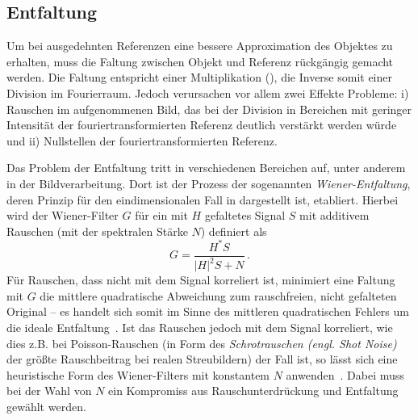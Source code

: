 \subsection{Entfaltung}
Um bei ausgedehnten Referenzen eine bessere Approximation des Objektes zu erhalten, muss die Faltung zwischen Objekt und Referenz rückgängig gemacht werden. Die Faltung entspricht einer Multiplikation (), die Inverse somit einer Division im Fourierraum. Jedoch verursachen vor allem zwei Effekte Probleme: i) Rauschen im aufgenommenen Bild, das bei der Division in Bereichen mit geringer Intensität der fouriertransformierten Referenz deutlich verstärkt werden würde und ii) Nullstellen der fouriertransformierten Referenz. 

Das Problem der Entfaltung tritt in verschiedenen Bereichen auf, unter anderem in der Bildverarbeitung.
Dort ist der Prozess der sogenannten \textit{Wiener-Entfaltung}, deren Prinzip für den eindimensionalen Fall in  dargestellt ist, etabliert. Hierbei wird der Wiener-Filter $G$ für ein mit $H$ gefaltetes Signal $S$ mit additivem Rauschen (mit der spektralen Stärke $N$) definiert als
\begin{equation}
	G=\frac{H^* S}{\left|H\right|^2 S+N}\,.
\end{equation}
Für Rauschen, dass nicht mit dem Signal korreliert ist, minimiert eine Faltung mit $G$ die mittlere quadratische Abweichung zum rauschfreien, nicht gefalteten Original -- es handelt sich somit im Sinne des mittleren quadratischen Fehlers um die ideale Entfaltung~\cite{castleman1996}. Ist das Rauschen jedoch mit dem Signal korreliert, wie dies z.B. bei Poisson-Rauschen (in Form des \textit{Schrotrauschen (engl. Shot Noise)} der größte Rauschbeitrag bei realen Streubildern) der Fall ist, so lässt sich eine heuristische Form des Wiener-Filters mit konstantem $N$ anwenden~\cite{he2004}. Dabei muss bei der Wahl von $N$ ein Kompromiss aus Rauschunterdrückung und Entfaltung gewählt werden.

